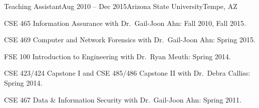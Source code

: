 
\def\PositionTitle{Teaching Assistant}
\def\PositionPeriod{Aug 2010 -- Dec 2015}
\def\OrgName{Arizona State University}
\def\OrgLocation{Tempe, AZ}


\begin{rExperience}{\PositionTitle}{\PositionPeriod}{\OrgName}{\OrgLocation}

  \item CSE 465 Information Assurance with Dr.\ Gail-Joon Ahn: Fall 2010, Fall 2015.

  \item CSE 469 Computer and Network Forensics with Dr.\ Gail-Joon Ahn: Spring 2015.

  \item FSE 100 Introduction to Engineering with Dr.\ Ryan Meuth: Spring 2014.

  \item CSE 423/424 Capstone I and CSE 485/486 Capstone II with Dr.\ Debra Calliss: Spring 2014.

  \item CSE 467 Data \& Information Security with Dr.\ Gail-Joon Ahn: Spring 2011.

\end{rExperience}
